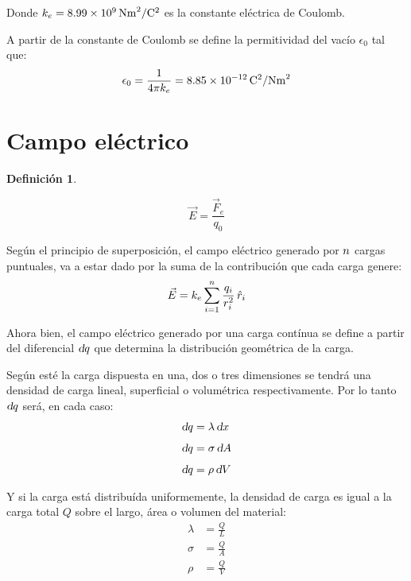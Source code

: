 \documentclass[a5paper,12pt,twoside]{book}
\newtheorem{defn}{{Definición}}[chapter]
\begin{document}
Donde $k_e=8.99 \times 10^9\,\si{\newton\metre^2\per\coulomb^2}$ es la constante eléctrica de Coulomb.

A partir de la constante de Coulomb se define la permitividad del vacío $\epsilon_0$ tal que:
\begin{equation}
    \epsilon_0 = \dfrac{1}{4 \pi k_e} = 8.85 \times 10^{-12} \,\si{\coulomb^2\per\newton\metre^2}
\end{equation}


\section{Campo eléctrico}

\begin{mdframed}[style=MyFrame1]
    \begin{defn}
    \end{defn}
    \begin{equation*}
        \Vec{E} = \frac{\Vec{F}_e}{q_0}
    \end{equation*}
\end{mdframed}

Según el principio de superposición, el campo eléctrico generado por $n$ cargas puntuales, va a estar dado por la suma de la contribución que cada carga genere:
\begin{equation}
    \Vec{E}= k_e \sum_{i=1}^n \frac{q_i}{r_i^2} \, \hat{r}_i
\end{equation}

Ahora bien, el campo eléctrico generado por una carga contínua se define a partir del diferencial $\textsl{d} q$ que determina la distribución geométrica de la carga.

Según esté la carga dispuesta en una, dos o tres dimensiones se tendrá una densidad de carga lineal, superficial o volumétrica respectivamente. Por lo tanto $\textsl{d} q$ será, en cada caso:
\begin{align*}
    \textsl{d} q &= \lambda \, \textsl{d} x
    \\[1ex]
    \textsl{d} q &= \sigma \, \textsl{d} A
    \\[1ex]
    \textsl{d} q &= \rho \, \textsl{d} V
\end{align*}

Y si la carga está distribuída uniformemente, la densidad de carga es igual a la carga total $Q$ sobre el largo, área o volumen del material:
\begin{align*}
    \lambda &= \frac{Q}{L}
    \\[1ex]
    \sigma &= \frac{Q}{A}
    \\[1ex]
    \rho &= \frac{Q}{V}
\end{align*}
\end{document}

